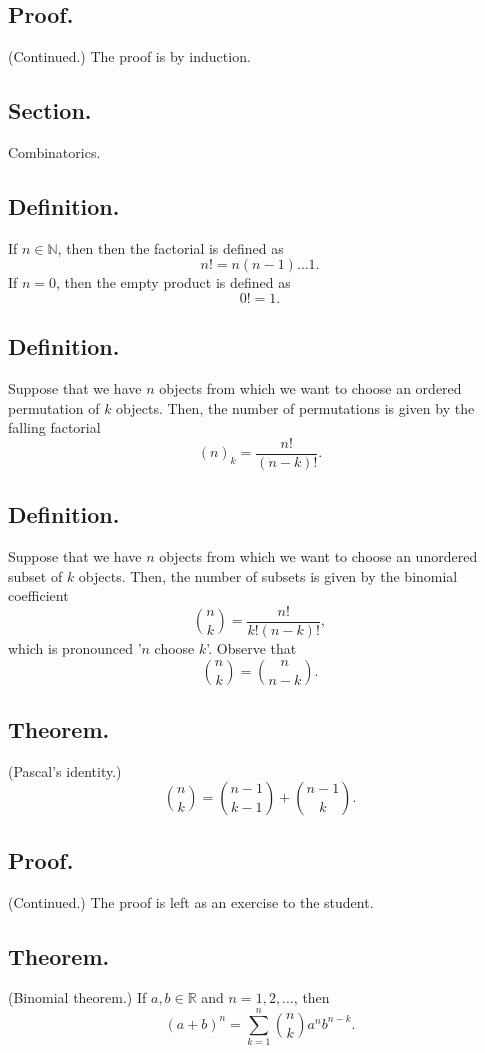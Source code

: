 \documentclass[titlepage]{article}
\begin{document}
\subsection{Proof.} (Continued.) The proof is by induction.

\newpage {}

\subsection{Section.} Combinatorics.

\subsection{Definition.} If $n \in \mathbb{N}$, then then the factorial is defined as 
$$n! = n(n-1)\ldots1.$$
If $n = 0$, then the empty product is defined as 
$$0! = 1.$$

\subsection{Definition.} Suppose that we have $n$ objects from which we want to choose an ordered permutation of $k$ objects. Then, the number of permutations is given by the falling factorial 
$$(n)_{k} = \frac{n!}{(n-k)!}.$$

\subsection{Definition.} Suppose that we have $n$ objects from which we want to choose an unordered subset of $k$ objects. Then, the number of subsets is given by the binomial coefficient 
$$\binom{n}{k} = \frac{n!}{k!(n-k)!},$$
which is pronounced '$n$ choose $k$'. Observe that 
$$\binom{n}{k} = \binom{n}{n-k}.$$

\subsection{Theorem.} (Pascal's identity.) 
$$\binom{n}{k} = \binom{n-1}{k-1} + \binom{n-1}{k}.$$

\subsection{Proof.} (Continued.) The proof is left as an exercise to the student.

\subsection{Theorem.} (Binomial theorem.) If $a, b \in \mathbb{R}$ and $n = 1, 2, \ldots$, then 
$$(a + b)^{n} = \sum_{k=1}^{n}\binom{n}{k}a^{n}b^{n-k}.$$
\end{document}
